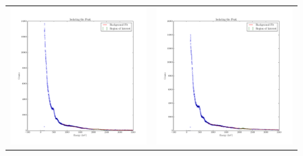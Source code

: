 \documentclass{article}
\begin{document}
  \begin{figure}[!htb]
    \centering
    \begin{tabular}{c c}
      \includegraphics[scale=.4]{../plots/peak_isolation_lead_portclosed.pdf} & \includegraphics[scale=.4]{../plots/peak_isolation_lead_portopen.pdf} \\

\end{tabular}
\end{figure}
\end{document}
